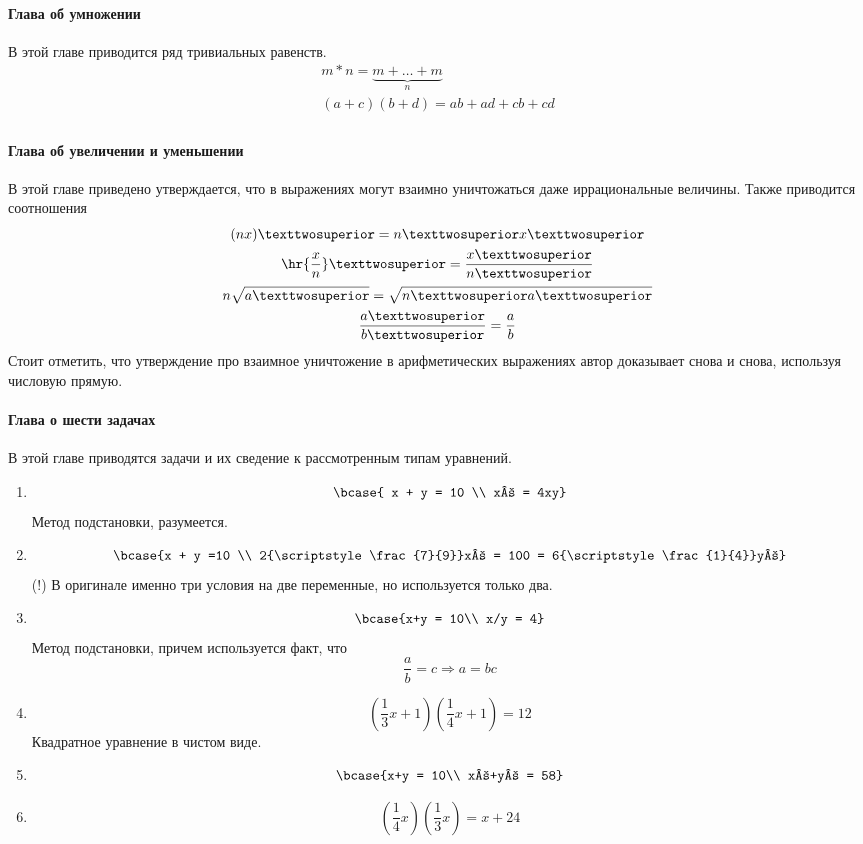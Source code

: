 \documentclass[unicode, 10pt, a4paper, oneside, fleqn]{article}
\begin{document}
\paragraph{Глава об умножении}
В этой главе приводится ряд тривиальных равенств.
\begin{gather}
  m*n = \underbrace{m+\dots+m}_{n} \\
  (a+c)(b+d) = ab + ad + cb + cd \\
\end{gather}
\paragraph{Глава об увеличении и уменьшении}
В этой главе приведено утверждается, что в выражениях могут
взаимно уничтожаться даже иррациональные величины. Также
приводится соотношения
\begin{gather}
  (nx)² = n²x² \\
  \hr{\frac{x}{n}}² = \frac{x²}{n²} \\
  n\sqrt{a²} = \sqrt{n²a² } \\
  \frac{a²}{b²} = \frac{a}{b}
\end{gather}
Стоит отметить, что утверждение про взаимное уничтожение
в арифметических выражениях автор доказывает снова и снова,
используя числовую прямую.
\paragraph{Глава о шести задачах}
В этой главе приводятся задачи и их сведение к рассмотренным
типам уравнений.
\begin{enumerate}
\item $$ \bcase{ x + y = 10 \\ x² = 4xy} $$
  Метод подстановки, разумеется.
\item $$\bcase {x + y =10 \\ 2{\scriptstyle\frac{7}{9}}x² = 100 = 6{\scriptstyle\frac{1}{4}}y²} $$
  (!) В оригинале именно три условия на две переменные, но используется только два.
\item $$ \bcase{x+y = 10\\ x/y = 4} $$
  Метод подстановки, причем используется факт, что
  \begin{displaymath}
    \frac{a}{b} = c ⇒a = bc
  \end{displaymath}
  \item $$ ({\scriptstyle\frac{1}{3}}x +1)({\scriptstyle\frac{1}{4}}x+1) = 12 $$
    Квадратное уравнение в чистом виде.
  \item $$ \bcase{x+y = 10\\ x²+y² = 58} $$
  \item $$ ({\scriptstyle\frac{1}{4}}x)({\scriptstyle\frac{1}{3}}x) = x + 24 $$
\end{enumerate}
\end{document}
